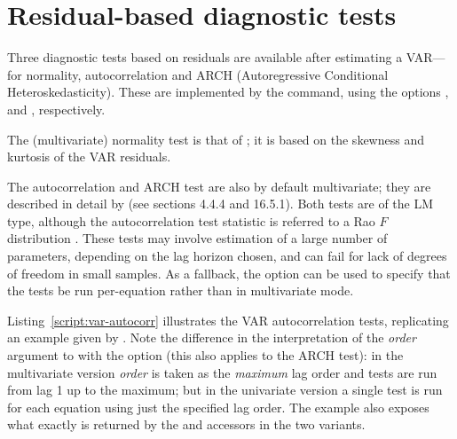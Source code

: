 \section{Residual-based diagnostic tests}

Three diagnostic tests based on residuals are available after
estimating a VAR---for normality, autocorrelation and ARCH
(Autoregressive Conditional Heteroskedasticity). These are implemented
by the  command, using the options ,
 and , respectively.

The (multivariate) normality test is that of \cite{doornik-hansen94};
it is based on the skewness and kurtosis of the VAR residuals.

The autocorrelation and ARCH test are also by default multivariate;
they are described in detail by \cite{Lutkepohl05} (see sections 4.4.4
and 16.5.1). Both tests are of the LM type, although the
autocorrelation test statistic is referred to a Rao $F$ distribution
\citep{Rao73}. These tests may involve estimation of a large number of
parameters, depending on the lag horizon chosen, and can fail for lack
of degrees of freedom in small samples. As a fallback, the
 option can be used to specify that the tests
be run per-equation rather than in multivariate mode.

Listing~\ref{script:var-autocorr} illustrates the VAR autocorrelation
tests, replicating an example given by \citet[p.\ 174]{Lutkepohl05}.
Note the difference in the interpretation of the \textsl{order}
argument to  with the  option (this also
applies to the ARCH test): in the multivariate version \textsl{order}
is taken as the \textit{maximum} lag order and tests are run from lag
1 up to the maximum; but in the univariate version a single test is
run for each equation using just the specified lag order. The example
also exposes what exactly is returned by the  and
 accessors in the two variants.

